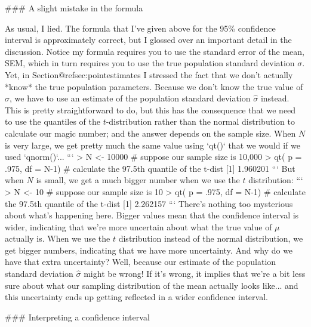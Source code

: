 ### A slight mistake in the formula

As usual, I lied. The formula that I've given above for the 95\% confidence interval is approximately correct, but I glossed over an important detail in the discussion. Notice my formula requires you to use the standard error of the mean, SEM, which in turn requires you to use the true population standard deviation $\sigma$. Yet, in Section@refsec:pointestimates I stressed the fact that we don't actually *know* the true population parameters. Because we don't know the true value of $\sigma$, we have to use an estimate of the population standard deviation $\hat{\sigma}$ instead. This is pretty straightforward to do, but this has the consequence that we need to use the quantiles of the $t$-distribution rather than the normal distribution to calculate our magic number; and the answer depends on the sample size. When $N$ is very large, we get pretty much the same value using `qt()` that we would if we used `qnorm()`...
```
> N <- 10000   # suppose our sample size is 10,000
> qt( p = .975, df = N-1)   # calculate the 97.5th quantile of the t-dist
[1] 1.960201
```
But when $N$ is small, we get a much bigger number when we use the $t$ distribution:
```
> N <- 10   # suppose our sample size is 10
> qt( p = .975, df = N-1)   # calculate the 97.5th quantile of the t-dist
[1] 2.262157
```
There's nothing too mysterious about what's happening here. Bigger values mean that the confidence interval is wider, indicating that we're more uncertain about what the true value of $\mu$ actually is. When we use the $t$ distribution instead of the normal distribution, we get bigger numbers, indicating that we have more uncertainty. And why do we have that extra uncertainty? Well, because our estimate of the population standard deviation $\hat\sigma$ might be wrong! If it's wrong, it implies that we're a bit less sure about what our sampling distribution of the mean actually looks like... and this uncertainty ends up getting reflected in a wider confidence interval.  


### Interpreting a confidence interval

